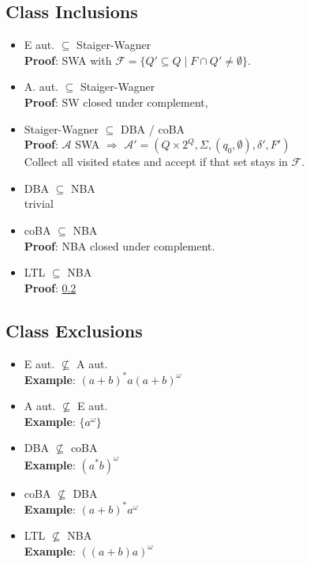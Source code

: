 \documentclass{article}
\begin{document}
\subsection{Class Inclusions}
\begin{itemize}
	\item E aut. $\subseteq$ Staiger-Wagner \\
		\textbf{Proof}: SWA with $\mathcal{F} = \{ Q' \subseteq Q \mid F \cap Q' \neq \emptyset \}$.
    \item A. aut. $\subseteq$ Staiger-Wagner \\
    	\textbf{Proof}: SW closed under complement,
    \item Staiger-Wagner $\subseteq$ DBA / coBA \\
    	\textbf{Proof}: $\mathcal{A}$ SWA $\Rightarrow$ $\mathcal{A}' = (Q \times 2^Q, \Sigma, (q_0, \emptyset), \delta', F')$ \\
    	Collect all visited states and accept if that set stays in $\mathcal{F}$.
    \item DBA $\subseteq$ NBA \\
    	trivial
    \item coBA $\subseteq$ NBA \\
    	\textbf{Proof}: NBA closed under complement.
    \item LTL $\subseteq$ NBA \\
    	\textbf{Proof}: \ref{} %
\end{itemize}

\subsection{Class Exclusions}
\begin{itemize}
	\item E aut. $\not\subseteq$ A aut. \\
		\textbf{Example}: $(a+b)^* a (a+b)^\omega$
	\item A aut. $\not\subseteq$ E aut. \\
		\textbf{Example}: $\{a^\omega\}$
	\item DBA $\not\subseteq$ coBA \\
		\textbf{Example}: $(a^*b)^\omega$
	\item coBA $\not\subseteq$ DBA \\
		\textbf{Example}: $(a+b)^* a^\omega$
	\item LTL $\not\subseteq$ NBA \\
		\textbf{Example}: $((a+b) a)^\omega$
\end{itemize}
\end{document}
